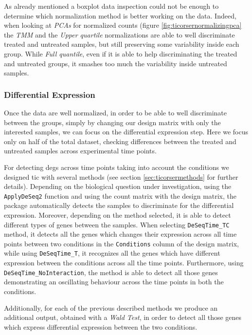 As already mentioned a boxplot data inspection could not be enough to determine which normalization method is better working on the data. 
Indeed, when looking at \textit{PCAs} for normalized counts (figure \ref{fig:ticorsernormalizingpca} the \textit{TMM} and the \textit{Upper quartile} normalizations are able to well discriminate treated and untreated samples, but still preserving some variability inside each group.
While \textit{Full quantile}, even if it is able to help discriminating the treated and untreated groups, it smashes too much the variability inside untreated samples.

\subsubsection{Differential Expression}
Once the data are well normalized, in order to be able to well discriminate between the groups, simply by changing our design matrix with only the interested samples, we can focus on the differential expression step.
Here we focus only on half of the total dataset, checking differences between the treated and untreated samples across experimental time points.

For detecting \glspl{deg} across time points taking into account the conditions we designed \gls{tic} with several methods (see section \ref{sec:ticorsermethods} for further details).
Depending on the biological question under investigation, using the \lstinline!ApplyDeSeq2! function and using the count matrix with the design matrix, the package automatically detects the samples to discriminate for the differential expression.
Moreover, depending on the method selected, it is able to detect different types of genes between the samples.
When selecting \lstinline!DeSeqTime_TC! method, it detects all the genes which changes their expression across all time points between two conditions in the \lstinline!Conditions! column of the design matrix, while using \lstinline!DeSeqTime_T!, it recognizes all the genes which have different expression between the conditions across all the time points. 
Furthermore, using \lstinline!DeSeqTime_NoInteraction!, the method is able to detect all those genes demonstrating an oscillating behaviour across the time points in both the conditions.

Additionally, for each of the previous described methods we produce an additional output, obtained with a \textit{Wald Test}, in order to detect all those genes which express differential expression between	the two conditions.

